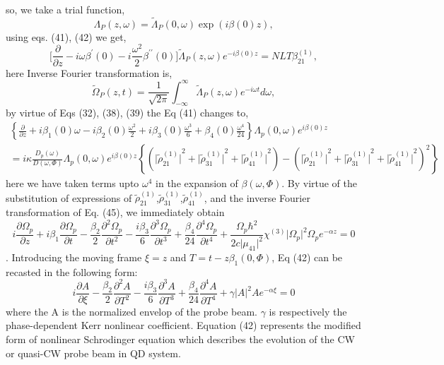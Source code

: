 \documentclass[12pt,a4paper]{article}
\begin{document}
so, we take a trial function,
\begin{equation}
    \Lambda_P(z,\omega)=\tilde\Lambda_P(0,\omega)\exp(i\beta(0)z),
\end{equation}
using eqs. (41), (42) we get,
\begin{equation}
    \big[\frac{\partial}{\partial z}-i\omega\beta^\prime(0)-i\frac{\omega^2}{2}\beta^{\prime\prime}(0)\big]\tilde\Lambda_P(z,\omega)e^{-i\beta(0)z}=NLT\beta^{(1)}_{21},
\end{equation}
here Inverse Fourier transformation is,
\begin{equation}
    \tilde\Omega_P(z,t)=\frac{1}{\sqrt{2\pi}}\int_{-\infty}^{\infty}\tilde\Lambda_P(z,\omega)e^{-i\omega t}d\omega,
\end{equation}
by virtue of Eqs (32), (38), (39) the Eq (41) changes to,
\begin{multline}
    {\left\lbrace{\frac{\partial}{\partial z}}+{i\beta_{1}(0)}     \omega -{i\beta_{2}(0)}\frac{\omega^2}{2}+{i\beta_{3}(0)}  \frac{\omega^3}{6}+{\beta_{4}(0)}\frac{\omega^4}{24}  \right\rbrace}{\Lambda_p{(0,\omega)}}e^{i{\beta{(0)}z}} \\ = {i\kappa}\frac{D_p{(\omega)}}{D{(\omega,\Phi)}}{\Lambda_p{(0,\omega)}}e^{i{\beta{(0)}z}}{\left\lbrace{{\left({\vert\tilde\rho^{(1)}_{21}\vert}^{2}+{\vert\tilde\rho^{(1)}_{31}\vert}^{2}+{\vert\tilde\rho^{(1)}_{41}\vert}^{2}\right)}-{\left({\vert\tilde\rho^{(1)}_{21}\vert}^{2}+{\vert\tilde\rho^{(1)}_{31}\vert}^{2}+{\vert\tilde\rho^{(1)}_{41}\vert}^{2}\right)}^2}\right\rbrace}
\end{multline}
here we have taken terms upto $\omega^{4}$ in the expansion of $\beta{(\omega ,\Phi)}$. By virtue of the substitution of expressions of $\tilde\rho^{(1)}_{21}$,$\tilde\rho^{(1)}_{31}$,$\tilde\rho^{(1)}_{41}$, and the inverse Fourier transformation of Eq. (45), we immediately obtain   
\begin{equation}
    {i\frac{\partial {\Omega_p}}{\partial z}}+{i\beta_{1}}{\frac{\partial {\Omega_p}}{\partial t}} -\frac{{\beta_{2}}}{2}{\frac{\partial^{2} {\Omega_p}}{\partial t^{2}}}-\frac{{i\beta_{3}}}{6}{\frac{\partial^{3} {\Omega_p}}{\partial t^{3}}}+\frac{{\beta_{4}}}{24}{\frac{\partial^{4} {\Omega_p}}{\partial t^{4}}}+{\frac{\Omega_{p}{\hbar}^{2}}{2c{\vert\mu_{41}\vert}^{2}}}{\chi^{(3)}}{\vert\Omega_{p}\vert}^{2}{\Omega_p}e^{-\alpha z} = 0
\end{equation}.
Introducing the moving frame $\xi = z$ and $T=t-z\beta_{1}{(0,\Phi)}$, Eq (42) can be recasted in the following form:
\begin{equation}
    {i\frac{\partial {A}}{\partial \xi}}-\frac{{\beta_{2}}}{2}{\frac{\partial^{2} {A}}{\partial T^{2}}}-\frac{{i\beta_{3}}}{6}{\frac{\partial^{3} {A}}{\partial T^{3}}}+\frac{{\beta_{4}}}{24}{\frac{\partial^{4} {A}}{\partial T^{4}}}+{\gamma}{\vert{A}\vert}^{2}Ae^{-\alpha \xi} = 0
\end{equation}
where the A is the normalized envelop of the probe beam. $\gamma$ is respectively the phase-dependent Kerr nonlinear coefficient. Equation (42) represents the modified form of nonlinear Schrodinger equation which describes the evolution of the CW or quasi-CW probe beam in QD system.
\end{document}

